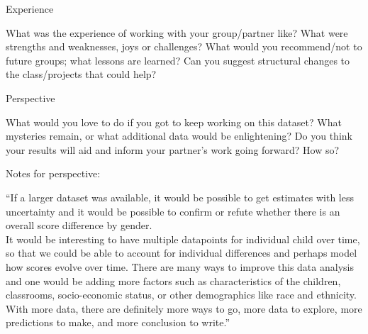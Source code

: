 \documentclass[
  ignorenonframetext,
]{beamer}
\begin{document}
\begin{frame}{Experience}
\protect\hypertarget{experience}{}

What was the experience of working with your group/partner like? What
were strengths and weaknesses, joys or challenges? What would you
recommend/not to future groups; what lessons are learned? Can you
suggest structural changes to the class/projects that could help?

\end{frame}

\begin{frame}{Perspective}
\protect\hypertarget{perspective}{}

What would you love to do if you got to keep working on this dataset?
What mysteries remain, or what additional data would be enlightening? Do
you think your results will aid and inform your partner's work going
forward? How so?

Notes for perspective:

``If a larger dataset was available, it would be possible to get
estimates with less uncertainty and it would be possible to confirm or
refute whether there is an overall score difference by gender.\\
It would be interesting to have multiple datapoints for individual child
over time, so that we could be able to account for individual
differences and perhaps model how scores evolve over time. There are
many ways to improve this data analysis and one would be adding more
factors such as characteristics of the children, classrooms,
socio-economic status, or other demographics like race and ethnicity.
With more data, there are definitely more ways to go, more data to
explore, more predictions to make, and more conclusion to write.''

\end{frame}
\end{document}
